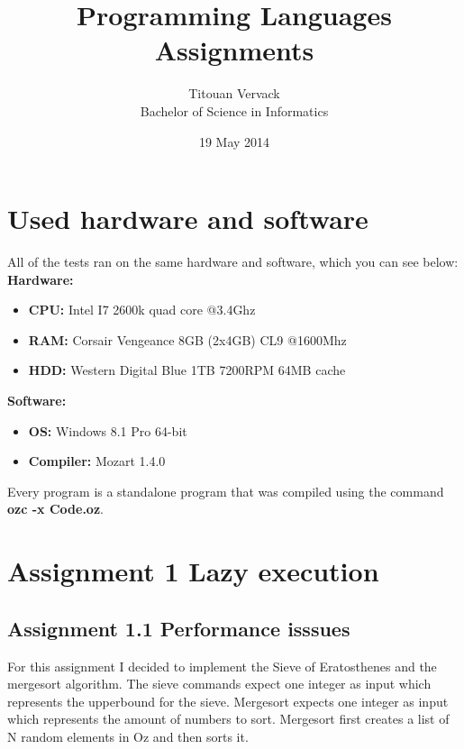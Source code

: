 \documentclass[12pt, a4paper]{article}
\begin{document}
\title{Programming Languages \\ Assignments}
\author{Titouan Vervack\\ Bachelor of Science in Informatics}
\date{19 May 2014}
\maketitle
\newpage
\section*{Used hardware and software}
All of the tests ran on the same hardware and software, which you can see below:\\
\textbf{Hardware:}
\begin{itemize}
	\item \textbf{CPU:} Intel I7 2600k quad core @3.4Ghz
	\item \textbf{RAM:} Corsair Vengeance 8GB (2x4GB) CL9 @1600Mhz
	\item \textbf{HDD:} Western Digital Blue 1TB 7200RPM 64MB cache\\
\end{itemize}
\textbf{Software:}
\begin{itemize}
	\item \textbf{OS:} Windows 8.1 Pro 64-bit
	\item \textbf{Compiler:} Mozart 1.4.0
\end{itemize}

Every program is a standalone program that was compiled using the command \textbf{ozc -x Code.oz}.
\section*{Assignment 1 Lazy execution}
\subsection*{Assignment 1.1 Performance isssues}
For this assignment I decided to implement the Sieve of Eratosthenes and the mergesort algorithm. The sieve commands expect one integer as input which represents the upperbound for the sieve. Mergesort expects one integer as input which represents the amount of numbers to sort. Mergesort first creates a list of N random elements in Oz and then sorts it.
\end{document}
